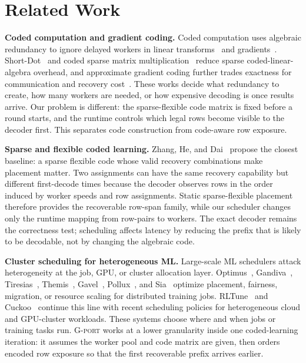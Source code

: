 \section{Related Work}

\textbf{Coded computation and gradient coding.}
Coded computation uses algebraic redundancy to ignore delayed workers in linear
transforms~\cite{lee2018speeding} and gradients~\cite{tandon2017gradient}.
Short-Dot~\cite{dutta2016shortdot} and coded sparse matrix
multiplication~\cite{wang2018codedsparse} reduce sparse coded-linear-algebra
overhead, and approximate gradient coding further trades exactness for
communication and recovery cost~\cite{song2025approxgc}.  These works decide
what redundancy to create, how many workers are needed, or how expensive
decoding is once results arrive.  Our problem is different: the sparse-flexible
code matrix is fixed before a round starts, and the runtime controls which
legal rows become visible to the decoder first.  This separates code
construction from code-aware row exposure.

\textbf{Sparse and flexible coded learning.}
Zhang, He, and Dai~\cite{zhang2025sparseflexible} propose the closest baseline:
a sparse flexible code whose valid recovery combinations make placement matter.
Two assignments can have the same recovery capability but different first-decode
times because the decoder observes rows in the order induced by worker speeds
and row assignments.  Static sparse-flexible placement therefore provides the
recoverable row-span family, while our scheduler changes only the runtime
mapping from row-pairs to workers.  The exact decoder remains the correctness
test; scheduling affects latency by reducing the prefix that is likely to be
decodable, not by changing the algebraic code.

\textbf{Cluster scheduling for heterogeneous ML.}
Large-scale ML schedulers attack heterogeneity at the job, GPU, or cluster
allocation layer.  Optimus~\cite{peng2018optimus}, Gandiva~\cite{xiao2018gandiva},
Tiresias~\cite{gu2019tiresias}, Themis~\cite{mahajan2020themis},
Gavel~\cite{narayanan2020gavel}, Pollux~\cite{qiao2021pollux}, and
Sia~\cite{subramanya2023sia} optimize placement, fairness, migration, or
resource scaling for distributed training jobs.  RLTune~\cite{dongare2025rltune}
and Cuckoo~\cite{zhang2025cuckoo} continue this line with recent scheduling
policies for heterogeneous cloud and GPU-cluster workloads.  These systems
choose where and when jobs or training tasks run.  \textsc{G-port} works at a lower
granularity inside one coded-learning iteration: it assumes the worker pool and
code matrix are given, then orders encoded row exposure so that the first
recoverable prefix arrives earlier.

